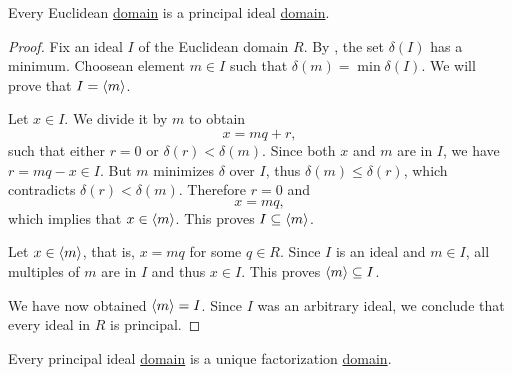 \begin{proposition}\label{thm:euclidean_domain_is_pid}
  Every Euclidean \hyperref[def:semiring/euclidean_domain]{domain} is a principal ideal \hyperref[def:semiring/principal_ideal_domain]{domain}.
\end{proposition}
\begin{proof}
  Fix an ideal \( I \) of the Euclidean domain \( R \). By , the set \( \delta(I) \) has a minimum. Choose\AOC an element \( m \in I \) such that \( \delta(m) = \min \delta(I) \). We will prove that \( I = \left\langle m \right\rangle \).

  Let \( x \in I \). We divide it by \( m \) to obtain
  \begin{equation*}
    x = mq + r,
  \end{equation*}
  such that either \( r = 0 \) or \( \delta(r) < \delta(m) \). Since both \( x \) and \( m \) are in \( I \), we have \( r = mq - x \in I \). But \( m \) minimizes \( \delta \) over \( I \), thus \( \delta(m) \leq \delta(r) \), which contradicts \( \delta(r) < \delta(m) \). Therefore \( r = 0 \) and
  \begin{equation*}
    x = mq,
  \end{equation*}
  which implies that \( x \in \left\langle m \right\rangle \). This proves \( I \subseteq \left\langle m \right\rangle \).

  Let \( x \in \left\langle m \right\rangle \), that is, \( x = mq \) for some \( q \in R \). Since \( I \) is an ideal and \( m \in I \), all multiples of \( m \) are in \( I \) and thus \( x \in I \). This proves \( \left\langle m \right\rangle \subseteq I \).

  We have now obtained \( \left\langle m \right\rangle = I \). Since \( I \) was an arbitrary ideal, we conclude that every ideal in \( R \) is principal.
\end{proof}

\begin{proposition}\label{thm:pid_is_ufd}
  Every principal ideal \hyperref[def:semiring/principal_ideal_domain]{domain} is a unique factorization \hyperref[def:semiring/unique_factorization_domain]{domain}.
\end{proposition}

